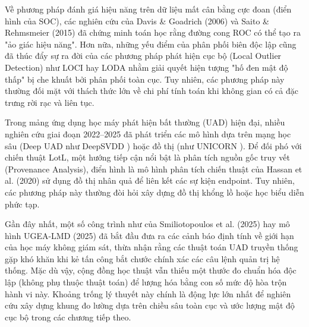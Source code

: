 ﻿\documentclass[../main.tex]{subfiles}
\begin{document}
Về phương pháp đánh giá hiệu năng trên dữ liệu mất cân bằng cực đoan (điển hình của SOC), các nghiên cứu của Davis \& Goadrich (2006) \cite{davis2006relationship} và Saito \& Rehmsmeier (2015) \cite{saito2015precision} đã chứng minh toán học rằng đường cong ROC có thể tạo ra "ảo giác hiệu năng". Hơn nữa, những yếu điểm của phân phối biên độc lập cũng đã thúc đẩy sự ra đời của các phương pháp phát hiện cục bộ (Local Outlier Detection) như LOCI \cite{papadimitriou2003loci} hay LODA \cite{pevny2016loda} nhằm giải quyết hiện tượng "hố đen mật độ thấp" bị che khuất bởi phân phối toàn cục. Tuy nhiên, các phương pháp này thường đối mặt với thách thức lớn về chi phí tính toán khi không gian có cả đặc trưng rời rạc và liên tục.

Trong mảng ứng dụng học máy phát hiện bất thường (UAD) hiện đại, nhiều nghiên cứu giai đoạn 2022–2025 đã phát triển các mô hình dựa trên mạng học sâu (Deep UAD như DeepSVDD \cite{ruff2018deep}) hoặc đồ thị (như UNICORN \cite{han2020unicorn}). Để đối phó với chiến thuật LotL, một hướng tiếp cận nổi bật là phân tích nguồn gốc truy vết (Provenance Analysis), điển hình là mô hình phân tích chiến thuật của Hassan et al. (2020) \cite{hassan2020tactical} sử dụng đồ thị nhân quả để liên kết các sự kiện endpoint. Tuy nhiên, các phương pháp này thường đòi hỏi xây dựng đồ thị khổng lồ hoặc học biểu diễn phức tạp.

Gần đây nhất, một số công trình như của Smiliotopoulos et al. (2025) \cite{smiliotopoulos2025detection} hay mô hình UGEA-LMD (2025) \cite{ugea_lmd_2025} đã bắt đầu đưa ra các cảnh báo định tính về giới hạn của học máy không giám sát, thừa nhận rằng các thuật toán UAD truyền thống gặp khó khăn khi kẻ tấn công bắt chước chính xác các câu lệnh quản trị hệ thống. Mặc dù vậy, cộng đồng học thuật vẫn thiếu một thước đo chuẩn hóa độc lập (không phụ thuộc thuật toán) để lượng hóa bằng con số mức độ hòa trộn hành vi này. Khoảng trống lý thuyết này chính là động lực lớn nhất để nghiên cứu xây dựng khung đo lường dựa trên chiều sâu toàn cục và ước lượng mật độ cục bộ trong các chương tiếp theo.
\end{document}
